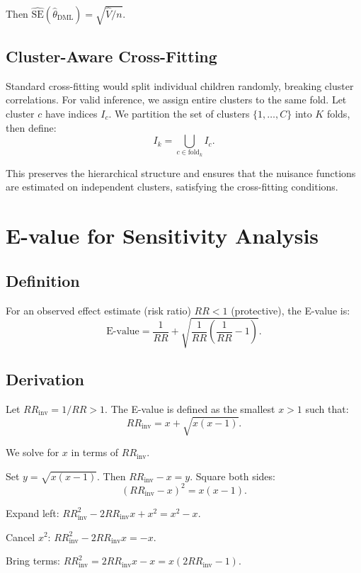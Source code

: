 \documentclass[12pt]{article}
\numberwithin{equation}{section}
\begin{document}
	Then $\widehat{\text{SE}}(\hat{\theta}_{\text{DML}}) = \sqrt{\hat{V} / n}$.
	
	\subsection{Cluster-Aware Cross-Fitting}
	
	Standard cross-fitting would split individual children randomly, breaking cluster correlations. For valid inference, we assign entire clusters to the same fold. Let cluster $c$ have indices $I_c$. We partition the set of clusters $\{1,\dots,C\}$ into $K$ folds, then define:
	\[
	I_k = \bigcup_{c \in \text{fold}_k} I_c.
	\]
	
	This preserves the hierarchical structure and ensures that the nuisance functions are estimated on independent clusters, satisfying the cross-fitting conditions.
	
	\section{E-value for Sensitivity Analysis}
	
	\subsection{Definition}
	
	For an observed effect estimate (risk ratio) $RR < 1$ (protective), the E-value is:
	\[
	\text{E-value} = \frac{1}{RR} + \sqrt{\frac{1}{RR}\left(\frac{1}{RR} - 1\right)}.
	\]
	
	\subsection{Derivation}
	
	Let $RR_{\text{inv}} = 1/RR > 1$. The E-value is defined as the smallest $x > 1$ such that:
	\[
	RR_{\text{inv}} = x + \sqrt{x(x-1)}.
	\]
	
	We solve for $x$ in terms of $RR_{\text{inv}}$.
	
	Set $y = \sqrt{x(x-1)}$. Then $RR_{\text{inv}} - x = y$. Square both sides:
	\[
	(RR_{\text{inv}} - x)^2 = x(x-1).
	\]
	
	Expand left: $RR_{\text{inv}}^2 - 2RR_{\text{inv}} x + x^2 = x^2 - x$.
	
	Cancel $x^2$: $RR_{\text{inv}}^2 - 2RR_{\text{inv}} x = -x$.
	
	Bring terms: $RR_{\text{inv}}^2 = 2RR_{\text{inv}} x - x = x(2RR_{\text{inv}} - 1)$.
	
\end{document}
